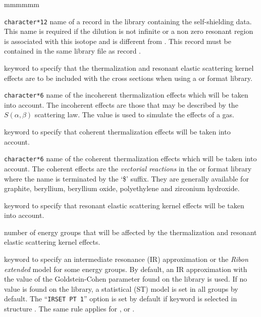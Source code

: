 \begin{ListeDeDescription}{mmmmmm}
\item[\dusa{NAMS}] {\tt character*12} name of a record in the library
containing the self-shielding data. This name is required if the dilution is
not infinite or a non zero resonant region is associated with this isotope and 
is different from . This record must be contained in the same
library file as record .

\item[\moc{THER}] keyword to specify that the thermalization and resonant elastic
scattering kernel effects are to be included with the cross sections when using a
 or  format library.

\item[\dusa{HINC}] {\tt character*6} name  of the incoherent thermalization
effects which will be taken into account. The incoherent effects are those that
may be described by the $S(\alpha,\beta)$ scattering law. The value 
is used to simulate the effects of a gas.

\item[\moc{TCOH}]  keyword to specify that coherent thermalization effects
will be taken into account.

\item[\dusa{HCOH}] {\tt character*6} name of the coherent thermalization
effects which will be taken into account. The coherent effects are the
{\sl vectorial reactions} in the  or  format library where
the name is terminated by the `\$' suffix. They are generally available for
graphite, beryllium, beryllium oxide, polyethylene and zirconium hydroxide.

\item[\moc{RESK}]  keyword to specify that resonant elastic scattering kernel effects
will be taken into account.

\item[\dusa{ntfg}]  number of energy groups that will be affected by the
thermalization and resonant elastic scattering kernel effects.

\item[\moc{IRSET}] keyword to specify an intermediate resonance (IR)
approximation or the {\sl Ribon extended} model for some energy groups. By default, an
IR approximation with the value of the Goldstein-Cohen parameter found on the library
is used. If no value is found on the library, a statistical (ST) model\cite{st} is set in
all groups by default. The ``{\tt IRSET PT 1}'' option is set by default if keyword 
is selected in structure . The same rule applies for ,  or
.


\end{ListeDeDescription}
